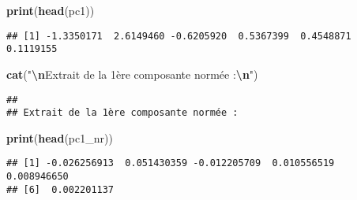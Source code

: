 \documentclass[
]{article}
\newenvironment{Shaded}{\begin{snugshade}}{\end{snugshade}}
\newcommand{\FunctionTok}[1]{\textcolor[rgb]{0.13,0.29,0.53}{\textbf{#1}}}
\newcommand{\NormalTok}[1]{#1}
\newcommand{\SpecialCharTok}[1]{\textcolor[rgb]{0.81,0.36,0.00}{\textbf{#1}}}
\newcommand{\StringTok}[1]{\textcolor[rgb]{0.31,0.60,0.02}{#1}}
\begin{document}
\begin{Shaded}
\begin{Highlighting}[]
\FunctionTok{print}\NormalTok{(}\FunctionTok{head}\NormalTok{(pc1))}
\end{Highlighting}
\end{Shaded}

\begin{verbatim}
## [1] -1.3350171  2.6149460 -0.6205920  0.5367399  0.4548871  0.1119155
\end{verbatim}

\begin{Shaded}
\begin{Highlighting}[]
\FunctionTok{cat}\NormalTok{(}\StringTok{"}\SpecialCharTok{\textbackslash{}n}\StringTok{Extrait de la 1ère composante normée :}\SpecialCharTok{\textbackslash{}n}\StringTok{"}\NormalTok{)}
\end{Highlighting}
\end{Shaded}

\begin{verbatim}
## 
## Extrait de la 1ère composante normée :
\end{verbatim}

\begin{Shaded}
\begin{Highlighting}[]
\FunctionTok{print}\NormalTok{(}\FunctionTok{head}\NormalTok{(pc1\_nr))}
\end{Highlighting}
\end{Shaded}

\begin{verbatim}
## [1] -0.026256913  0.051430359 -0.012205709  0.010556519  0.008946650
## [6]  0.002201137
\end{verbatim}
\end{document}
